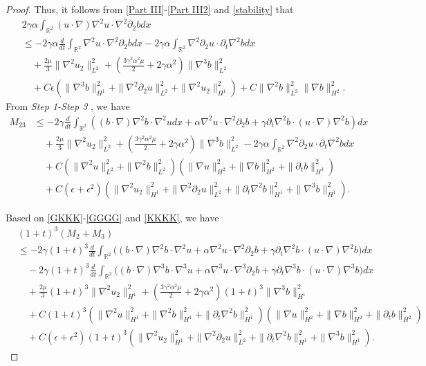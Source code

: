 \documentclass[reqno,11pt]{amsart}
\def\R{\mathbb R}
\numberwithin{Thm}{section}
\begin{document}
\begin{proof}
Thus, it follows from \eqref{Part III}-\eqref{Part III2}  and \eqref{stability} that
\begin{align*}
&2\gamma\alpha\int_{\R^2}(u\cdot\nabla)\nabla^2 u\cdot\nabla^2\partial_2 bdx\nonumber\\
&\leq-2\gamma\alpha\frac{d}{dt}\int_{\R^2}\nabla^2 u\cdot\nabla^2\partial_2 bdx-2\gamma\alpha\int_{\R^2}\nabla^2\partial_2u\cdot\partial_t\nabla^2 bdx\nonumber\\
&\quad+ \frac{2\mu}{3}\| \nabla^2 u_2\|_{L^2}^2+(\frac{3\gamma^2\alpha^2\mu}{2}+2\gamma\alpha^2)\|\nabla^3 b\|_{L^2}^2 \nonumber\\
&\quad+C\epsilon(\|\nabla^3b\|_{H^1}^2+\|\nabla^2 \partial_2u\|_{L^2}^2+\|\nabla^2 u_2\|_{H^1}^2)+C\|\nabla^2 b\|_{L^2}^2\|\nabla b\|_{H^2}^2.
\end{align*}
From {\it Step 1-Step 3 }, we have
\begin{align}\label{KKKK}
M_{23}&\leq
-2\gamma\frac{d}{dt}\int_{\R^2}((b\cdot\nabla)\nabla^2 b\cdot\nabla^2 udx+\alpha\nabla^2 u\cdot\nabla^2\partial_2 b+\gamma\partial_{t}\nabla^2 b\cdot (u\cdot\nabla)\nabla^2 b)dx\nonumber\\
&\quad+\frac{2\mu}{3}\| \nabla^2 u_2\|_{L^2}^2+(\frac{3\gamma^2\alpha^2\mu}{2}+2\gamma\alpha^2)\|\nabla^3 b\|_{L^2}^2-2\gamma\alpha\int_{\R^2}\nabla^2\partial_2u\cdot\partial_t\nabla^2 bdx\nonumber\\
&\quad+C(\|\nabla^2u\|_{L^2}^2+\|\nabla^2 b\|_{L^2}^2)\left(\|\nabla u\|_{H^2}^2+\|\nabla b\|_{H^2}^2+\|\partial_tb\|_{H^3}^2\right)\nonumber\\
&\quad+C\left(\epsilon+\epsilon^2\right)\left(\|\nabla^2 u_2\|_{H^{1}}^2+\|\nabla^2\partial_2 u\|_{L^{2}}^2+\|\partial_t\nabla^2 b\|_{H^1}^2+\|\nabla^3 b\|_{H^1}^2\right).
\end{align}

Based on \eqref{GKKK}-\eqref{GGGG} and \eqref{KKKK},  we have
\begin{align}\label{KKKKKK1}
&(1+t)^3(M_{2}+M_{3})\nonumber\\&\leq
-2\gamma(1+t)^3\frac{d}{dt}\int_{\R^2}\big((b\cdot\nabla)\nabla^2 b\cdot\nabla^2 u+\alpha\nabla^2 u\cdot\nabla^2\partial_2 b+\gamma\partial_{t}\nabla^2 b\cdot (u\cdot\nabla)\nabla^2 b\big)dx\nonumber\\
&\quad-2\gamma(1+t)^3\frac{d}{dt}\int_{\R^2}\big((b\cdot\nabla)\nabla^3 b\cdot\nabla^3 u+\alpha\nabla^3 u\cdot\nabla^3\partial_2 b+\gamma\partial_{t}\nabla^3 b\cdot (u\cdot\nabla)\nabla^3 b\big)dx\nonumber\\
&\quad+\frac{2\mu}{3}(1+t)^3\| \nabla^2 u_2\|_{H^1}^2+(\frac{3\gamma^2\alpha^2\mu}{2}+2\gamma\alpha^2)(1+t)^3\|\nabla^3 b\|_{H^1}^2\nonumber\\
&\quad+C(1+t)^3(\|\nabla^2u\|_{H^1}^2+\|\nabla^2 b\|_{H^1}^2+\|\partial_t\nabla^2 b\|_{H^1}^2)\left(\|\nabla u\|_{H^2}^2+\|\nabla b\|_{H^2}^2+\|\partial_tb\|_{H^2}^2\right)\nonumber\\
&\quad+C\left(\epsilon+\epsilon^2\right)(1+t)^3\left(\|\nabla^2 u_2\|_{H^{1}}^2+\|\nabla^2\partial_2 u\|_{L^{2}}^2+\|\partial_t\nabla^2 b\|_{H^1}^2+\|\nabla^3 b\|_{H^1}^2\right).
\end{align}


\end{proof}
\end{document}
